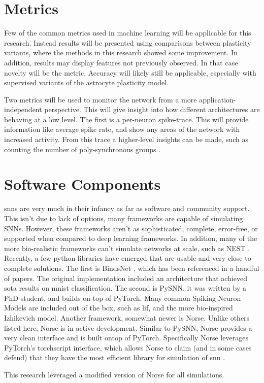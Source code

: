     \section{Metrics} \label{section:metrics}
    Few of the common metrics used in machine learning will be applicable for
    this research. Instead results will be presented using comparisons between
    plasticity variants, where the methods in this research showed some
    improvement. In addition, results may display features not previously
    observed. In that case novelty will be the metric. Accuracy will likely
    still be applicable, especially with supervised variants of the astrocyte
    plasticity model.
    
    Two metrics will be used to monitor the network from a more
    application-independent perspective. This will give insight into how
    different architectures are behaving at a low level. The first is a
    per-neuron spike-trace. This will provide information like average spike
    rate, and show any areas of the network with increased activity. From this
    trace a higher-level insights can be made, such as counting the number of
    poly-synchronous groups \cite{sgnn_transistor}.
    
    \section{Software Components}
    \Glspl{snn} are very much in their infancy as far as software and community
    support. This isn't due to lack of options, many frameworks are capable of
    simulating SNNs. However, these frameworks aren't as sophisticated,
    complete, error-free, or supported when compared to deep learning
    frameworks. In addition, many of the more bio-realistic frameworks can't
    simulate networks at scale, such as NEST \parencite{nest}. Recently, a few
    python libraries have emerged that are usable and very close to complete
    solutions. The first is BindsNet \parencite{bindsnet}, which has been
    referenced in a handful of papers. The original implementation included an
    architecture that achieved \acrshort{sota} results on \gls{mnist}
    classification. The second is PySNN, it was written by a PhD student, and
    builds on-top of PyTorch. Many common Spiking Neuron Models are included out
    of the box, such as \gls{lif}, and the more bio-inspired Izhikevich
    model. Another framework, somewhat newer is Norse. Unlike others listed
    here, Norse is in active development. Similar to PySNN, Norse provides a
    very clean interface and is built ontop of PyTorch. Specifically Norse
    leverages PyTorch's torchscript interface, which allows Norse to claim (and
    in some cases defend) that they have the most efficient library for
    simulation of \gls{snn} \parencite{norse2021}.

    This research leveraged a modified version of Norse for all simulations.
    
